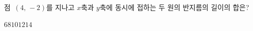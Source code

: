 점~$(4,\,-2)$를 지나고 $x$축과 $y$축에 동시에 접하는 두 원의 반지름의 길이의 합은?
\begin{choices32}{$6$}{$8$}{$10$}{$12$}{$14$}\end{choices32}
